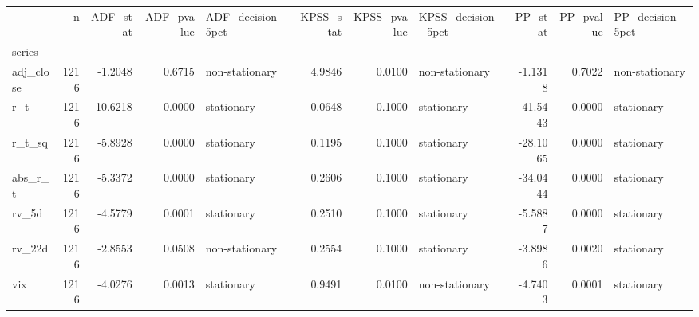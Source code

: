\begin{tabular}{lrrrlrrlrrl}
\toprule
 & n & ADF_stat & ADF_pvalue & ADF_decision_5pct & KPSS_stat & KPSS_pvalue & KPSS_decision_5pct & PP_stat & PP_pvalue & PP_decision_5pct \\
series &  &  &  &  &  &  &  &  &  &  \\
\midrule
adj_close & 1216 & -1.2048 & 0.6715 & non-stationary & 4.9846 & 0.0100 & non-stationary & -1.1318 & 0.7022 & non-stationary \\
r_t & 1216 & -10.6218 & 0.0000 & stationary & 0.0648 & 0.1000 & stationary & -41.5443 & 0.0000 & stationary \\
r_t_sq & 1216 & -5.8928 & 0.0000 & stationary & 0.1195 & 0.1000 & stationary & -28.1065 & 0.0000 & stationary \\
abs_r_t & 1216 & -5.3372 & 0.0000 & stationary & 0.2606 & 0.1000 & stationary & -34.0444 & 0.0000 & stationary \\
rv_5d & 1216 & -4.5779 & 0.0001 & stationary & 0.2510 & 0.1000 & stationary & -5.5887 & 0.0000 & stationary \\
rv_22d & 1216 & -2.8553 & 0.0508 & non-stationary & 0.2554 & 0.1000 & stationary & -3.8986 & 0.0020 & stationary \\
vix & 1216 & -4.0276 & 0.0013 & stationary & 0.9491 & 0.0100 & non-stationary & -4.7403 & 0.0001 & stationary \\
\bottomrule
\end{tabular}
